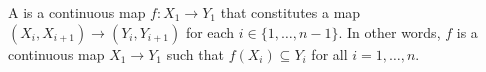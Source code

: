 \begin{definition} \label{definition:morphism_of_n_tuples_of_topological_spaces}
    A  is a continuous map $f: X_1 \to Y_1$ that constitutes a map $(X_i, X_{i+1}) \to (Y_i, Y_{i+1})$  for each $i \in \{1,\ldots,n-1\}$. In other words, $f$ is a continuous map $X_1 \to Y_1$ such that $f(X_i) \subseteq Y_i$ for all $i = 1, \dots, n$.
\end{definition}
